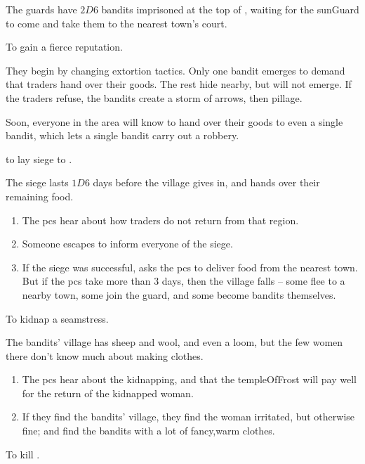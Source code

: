 \begin{multicols}{2}
\begin{dlist}
  The \glspl{guard} have $2D6$ bandits imprisoned at the top of , waiting for the \gls{sunGuard} to come and take them to the nearest town's \gls{court}.
  \item
  To gain a fierce reputation.

  They begin by changing extortion tactics.
  Only one bandit emerges to demand that traders hand over their goods.
  The rest hide nearby, but will not emerge.
  If the traders refuse, the bandits create a storm of arrows, then pillage.

  Soon, everyone in the area will know to hand over their goods to even a single bandit, which lets a single bandit carry out a robbery.

  \item
  to lay siege to .

  The siege lasts $1D6$ days before the \gls{village} gives in, and hands over their remaining food.
  \begin{enumerate}
    \item
    The \glspl{pc} hear about how traders do not return from that region.
    \item
    Someone escapes to inform everyone of the siege.
    \item
    If the siege was successful,  asks the \glspl{pc} to deliver food from the nearest town.
    But if the \glspl{pc} take more than 3 days, then the \gls{village} falls -- some flee to a nearby town, some join the \gls{guard}, and some become bandits themselves.
  \end{enumerate}
  \item
  To kidnap a seamstress.

  The bandits' \gls{village} has sheep and wool, and even a loom, but the few women there don't know much about making clothes.

  \begin{enumerate}
    \item
    The \glspl{pc} hear about the kidnapping, and that the \gls{templeOfFrost} will pay well for the return of the kidnapped woman.

    \item
    If they find the bandits' \gls{village}, they find the woman irritated, but otherwise fine; and find the bandits with a lot of fancy,warm clothes.
  \end{enumerate}
  \item
  To kill .


\end{dlist}
\end{multicols}
